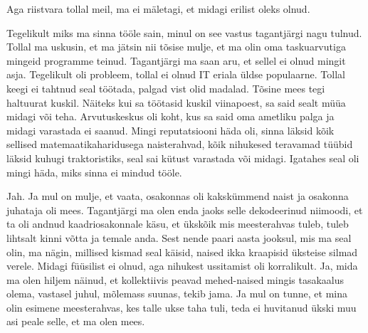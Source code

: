Aga riistvara tollal meil, ma ei mäletagi, et midagi erilist oleks olnud.


Tegelikult miks ma sinna tööle sain, minul on see vastus tagantjärgi nagu tulnud. Tollal ma uskusin, et ma jätsin nii tõsise mulje, et ma olin oma taskuarvutiga mingeid programme teinud. Tagantjärgi ma saan aru, et sellel ei olnud mingit asja. Tegelikult oli probleem, tollal ei olnud IT eriala üldse populaarne. Tollal keegi ei tahtnud seal töötada, palgad vist olid madalad. Tõsine mees tegi haltuurat kuskil. Näiteks kui sa töötasid kuskil viinapoest, sa said sealt müüa midagi või teha. Arvutuskeskus oli koht, kus sa said oma ametliku palga ja midagi varastada ei saanud. Mingi reputatsiooni häda oli, sinna läksid kõik sellised matemaatikaharidusega naisterahvad, kõik nihukesed teravamad tüübid läksid kuhugi traktoristiks, seal sai kütust varastada või midagi. Igatahes seal oli mingi häda, miks sinna ei mindud tööle. 


Jah. Ja mul on mulje, et vaata, osakonnas oli kakskümmend naist ja osakonna juhataja oli mees. Tagantjärgi ma olen enda jaoks selle dekodeerinud niimoodi, et ta oli andnud kaadriosakonnale käsu, et ükskõik mis meesterahvas tuleb, tuleb lihtsalt kinni võtta ja temale anda. Sest nende paari aasta jooksul, mis ma seal olin, ma nägin, millised kismad seal käisid, naised ikka kraapisid üksteise silmad verele. Midagi füüsilist ei olnud, aga  nihukest ussitamist oli korralikult. Ja, mida ma olen hiljem näinud, et kollektiivis peavad mehed-naised mingis tasakaalus olema, vastasel juhul, mõlemass suunas, tekib jama. Ja mul on tunne, et mina olin esimene meesterahvas, kes talle ukse taha tuli, teda ei huvitanud ükski muu asi peale selle, et ma olen mees.  


